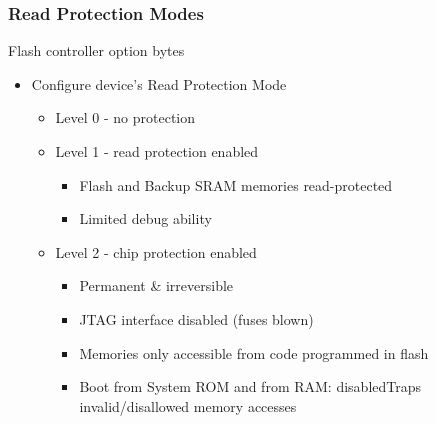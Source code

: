 \subsubsection{Read Protection Modes}
Flash controller option bytes
\begin{itemize}
  \item Configure device's Read Protection Mode
        \begin{itemize}
          \item Level 0 - no protection
          \item Level 1 - read protection enabled
                \begin{itemize}
                  \item Flash and Backup SRAM memories read-protected
                  \item Limited debug ability
                \end{itemize}
          \item Level 2 - chip protection enabled
                \begin{itemize}
                  \item Permanent \& irreversible
                  \item JTAG interface disabled (fuses blown)
                  \item Memories only accessible from code programmed in flash
                  \item Boot from System ROM and from RAM: disabledTraps invalid/disallowed memory accesses
                \end{itemize}
        \end{itemize}
\end{itemize}

